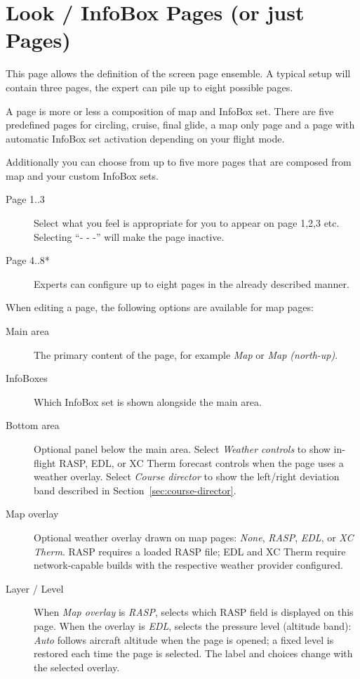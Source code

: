 \section{Look / InfoBox Pages (or just Pages)}\label{conf:screenpages}

This page allows the definition of the screen page ensemble. A typical setup 
will contain three pages, the expert can pile up to eight possible pages.

A page is more or less a composition of map and InfoBox set. There are five 
predefined pages for circling, cruise, final glide, a map only page and a 
page with automatic InfoBox set activation depending on your flight mode.

Additionally you can choose from up to five more pages that are composed from map 
and your custom InfoBox sets.  

\begin{description}
\item[Page 1..3]  Select what you feel is appropriate for you to appear on page 1,2,3 etc. 
  Selecting ``- - -'' will make the page inactive.
\item[Page 4..8*]  Experts can configure up to eight pages in the already 
  described manner.
\end{description}

When editing a page, the following options are available for map pages:
\begin{description}
\item[Main area]  The primary content of the page, for example \emph{Map}
  or \emph{Map (north-up)}.
\item[InfoBoxes]  Which InfoBox set is shown alongside the main area.
\item[Bottom area]  Optional panel below the main area.  Select
  \emph{Weather controls} to show in-flight RASP, EDL, or XC Therm forecast
  controls when the page uses a weather overlay.  Select \emph{Course
  director} to show the left/right deviation band described in
  Section~\ref{sec:course-director}.
\item[Map overlay]  Optional weather overlay drawn on map pages: \emph{None},
  \emph{RASP}, \emph{EDL}, or \emph{XC Therm}.  RASP requires a loaded RASP
  file; EDL and XC Therm require network-capable builds with the respective
  weather provider configured.
\item[Layer / Level]  When \emph{Map overlay} is \emph{RASP}, selects
  which RASP field is displayed on this page.  When the overlay is
  \emph{EDL}, selects the pressure level (altitude band): \emph{Auto}
  follows aircraft altitude when the page is opened; a fixed level is
  restored each time the page is selected.  The label and choices
  change with the selected overlay.
\end{description}


